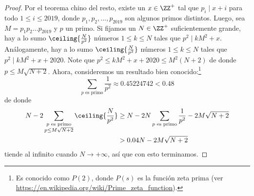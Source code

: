 \begin{proof}
  Por el teorema chino del resto, existe un $x\in\ZZ^+$ tal que $p_i\mid x+i$
  para todo $1\le i\le 2019$, donde $p_1,p_2,\dots,p_{2019}$ son algunos primos
  distintos. Luego, sea $M=p_1p_2\dots p_{2019}$ y $p$ un primo. Si fijamos un
  $N\in\ZZ^+$ suficientemente grande, hay a lo sumo $\ceiling{\frac{N}{p^2}}$
  números $1\le k\le N$ tales que $p^2\mid kM^2+x$. Análogamente, hay a lo sumo
  $\ceiling{\frac{N}{p^2}}$ números $1\le k\le N$ tales que
  $p^2\mid kM^2+x+2020$. Note que $p^2\le kM^2+x+2020\le M^2(N+2)$ de donde
  $p\le M\sqrt{N+2}$. Ahora, consideremos un resultado bien conocido:\footnote{%
    Es conocido como $P(2)$, donde $P(s)$ es la función zeta prima (ver
    \url{https://en.wikipedia.org/wiki/Prime_zeta_function}).%
  }
  \[\sum_{p\text{ es primo}}\frac{1}{p^2}\approx 0.45224742<0.48\]
  de donde
  \begin{align*}
    N-2\sum_{\substack{p\text{ es primo}\\p\le M\sqrt{N+2}}}\ceiling{\frac{N}{p^2}}
    &\ge N-2N\sum_{\substack{p\text{ es primo}}}\frac{1}{p^2}-2M\sqrt{N+2} \\
    &> 0.04N-2M\sqrt{N+2}
  \end{align*}
  tiende al infinito cuando $N\to+\infty$, así que con esto terminamos.
\end{proof}
